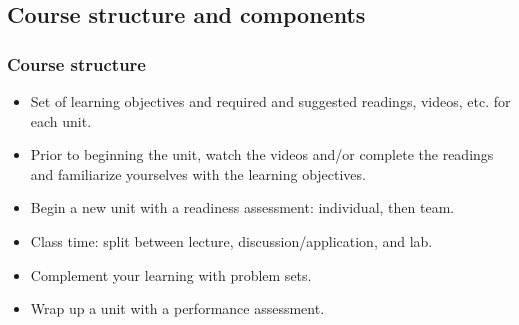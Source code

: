 \documentclass[slidestop,compress,mathserif,12pt,t,professionalfonts,xcolor=table]{beamer}
\begin{document}

\subsection{Course structure and components}


\begin{frame}
\frametitle{Course structure}

\begin{itemize}[<alert@+>]
\item Set of learning objectives and required and suggested readings, videos, etc. for 
each unit.
\item Prior to beginning the unit, watch the videos and/or complete the readings and 
familiarize yourselves with the learning objectives.
\item Begin a new unit with a readiness assessment: individual, then team.
\item Class time: split between lecture, discussion/application, and lab.
\item Complement your learning with problem sets.
\item Wrap up a unit with a performance assessment.
\end{itemize}


\end{frame}

\end{document}
